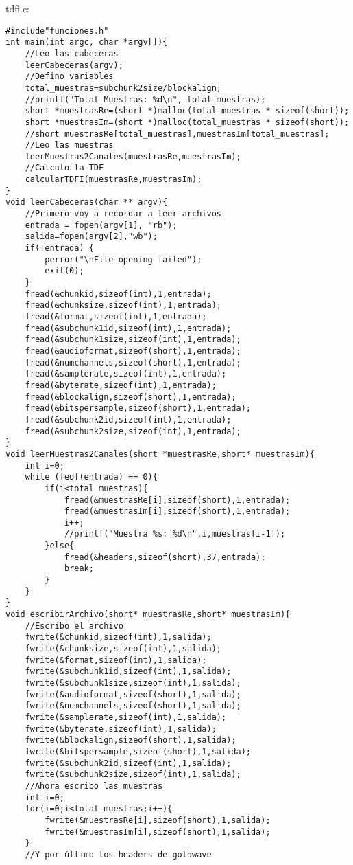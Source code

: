 tdfi.c:
\begin{lstlisting}[style=CStyle]
#include"funciones.h"
int main(int argc, char *argv[]){
	//Leo las cabeceras
	leerCabeceras(argv);
	//Defino variables    
	total_muestras=subchunk2size/blockalign;
	//printf("Total Muestras: %d\n", total_muestras);
	short *muestrasRe=(short *)malloc(total_muestras * sizeof(short));
	short *muestrasIm=(short *)malloc(total_muestras * sizeof(short));
	//short muestrasRe[total_muestras],muestrasIm[total_muestras];
	//Leo las muestras
	leerMuestras2Canales(muestrasRe,muestrasIm);
	//Calculo la TDF
	calcularTDFI(muestrasRe,muestrasIm);
}
void leerCabeceras(char ** argv){
	//Primero voy a recordar a leer archivos
	entrada = fopen(argv[1], "rb");
	salida=fopen(argv[2],"wb");
	if(!entrada) {
		perror("\nFile opening failed");
		exit(0);
	}
	fread(&chunkid,sizeof(int),1,entrada);
	fread(&chunksize,sizeof(int),1,entrada);
	fread(&format,sizeof(int),1,entrada);
	fread(&subchunk1id,sizeof(int),1,entrada);
	fread(&subchunk1size,sizeof(int),1,entrada);
	fread(&audioformat,sizeof(short),1,entrada);
	fread(&numchannels,sizeof(short),1,entrada);
	fread(&samplerate,sizeof(int),1,entrada);
	fread(&byterate,sizeof(int),1,entrada);
	fread(&blockalign,sizeof(short),1,entrada);
	fread(&bitspersample,sizeof(short),1,entrada);
	fread(&subchunk2id,sizeof(int),1,entrada);
	fread(&subchunk2size,sizeof(int),1,entrada);
}
void leerMuestras2Canales(short *muestrasRe,short* muestrasIm){
	int i=0;
	while (feof(entrada) == 0){
		if(i<total_muestras){
			fread(&muestrasRe[i],sizeof(short),1,entrada);
			fread(&muestrasIm[i],sizeof(short),1,entrada);
			i++;
			//printf("Muestra %s: %d\n",i,muestras[i-1]);
		}else{
			fread(&headers,sizeof(short),37,entrada);
			break;
		}
	}
}
void escribirArchivo(short* muestrasRe,short* muestrasIm){
	//Escribo el archivo
	fwrite(&chunkid,sizeof(int),1,salida);
	fwrite(&chunksize,sizeof(int),1,salida);
	fwrite(&format,sizeof(int),1,salida);
	fwrite(&subchunk1id,sizeof(int),1,salida);
	fwrite(&subchunk1size,sizeof(int),1,salida);
	fwrite(&audioformat,sizeof(short),1,salida);
	fwrite(&numchannels,sizeof(short),1,salida);
	fwrite(&samplerate,sizeof(int),1,salida);
	fwrite(&byterate,sizeof(int),1,salida);
	fwrite(&blockalign,sizeof(short),1,salida);
	fwrite(&bitspersample,sizeof(short),1,salida);
	fwrite(&subchunk2id,sizeof(int),1,salida);
	fwrite(&subchunk2size,sizeof(int),1,salida);
	//Ahora escribo las muestras
	int i=0;
	for(i=0;i<total_muestras;i++){
		fwrite(&muestrasRe[i],sizeof(short),1,salida);
		fwrite(&muestrasIm[i],sizeof(short),1,salida);
	}
	//Y por último los headers de goldwave

\end{lstlisting}
